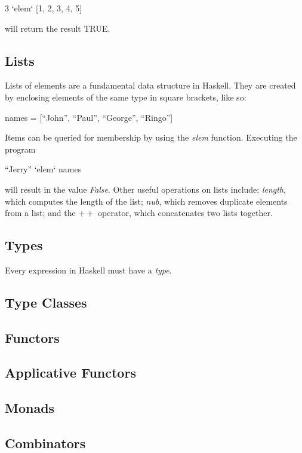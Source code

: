 \documentclass[thesis.tex]{subfiles}
\begin{document}
\begin{spec}
3 `elem` [1, 2, 3, 4, 5]
\end{spec}

will return the result TRUE.

\subsection{Lists}

Lists of elements are a fundamental data structure in Haskell. They are created by enclosing elements of
the same type in square brackets, like so:

\begin{spec}
names = [``John'', ``Paul'', ``George'', ``Ringo'']
\end{spec}

Items can be queried for membership by using the \emph{elem} function. Executing the program

\begin{spec}
``Jerry'' `elem` names
\end{spec}

will result in the value \emph{False}. Other useful operations on lists include: \emph{length}, which computes
the length of the list; \emph{nub}, which removes duplicate elements from a list; and the $++$ operator, which
concatenates two lists together.


\subsection{Types}

Every expression in Haskell must have a \emph{type}.


\subsection{Type Classes}

\subsection{Functors}

\subsection{Applicative Functors}

\subsection{Monads}

\subsection{Combinators}
\end{document}
